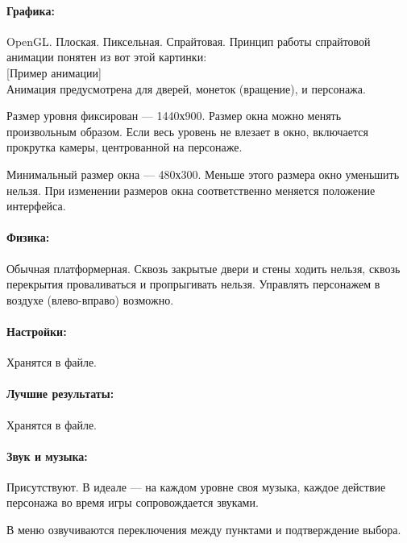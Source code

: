 \documentclass[12pt,a4paper]{article}
\begin{document}
\paragraph{Графика:}
OpenGL. Плоская. Пиксельная. Спрайтовая. Принцип работы спрайтовой анимации понятен из вот этой картинки:\\

{\color{blue}[Пример анимации]}\\

Анимация предусмотрена для дверей, монеток (вращение), и персонажа.

Размер уровня фиксирован --- 1440х900. Размер окна можно менять произвольным образом. Если весь уровень не влезает в окно, включается прокрутка камеры, центрованной на персонаже.

Минимальный размер окна --- 480х300. Меньше этого размера окно уменьшить нельзя. При изменении размеров окна соответственно меняется положение интерфейса.
\paragraph{Физика:}
Обычная платформерная. Сквозь закрытые двери и стены ходить нельзя, сквозь перекрытия проваливаться и пропрыгивать нельзя. Управлять персонажем в воздухе (влево-вправо) возможно.
\paragraph{Настройки:}
Хранятся в файле.
\paragraph{Лучшие результаты:}
Хранятся в файле.
\paragraph{Звук и музыка:}
Присутствуют. В идеале --- на каждом уровне своя музыка, каждое действие персонажа во время игры сопровождается звуками.

В меню озвучиваются переключения между пунктами и подтверждение выбора.
\end{document}
